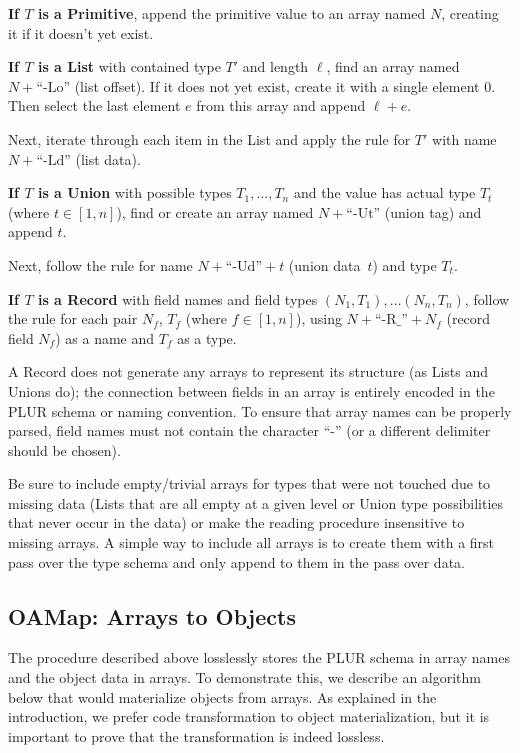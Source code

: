 \documentclass[10pt, conference, compsocconf]{IEEEtran}
\begin{document}
{\bf If $T$ is a Primitive}, append the primitive value to an array named $N$, creating it if it doesn't yet exist.

{\bf If $T$ is a List} with contained type $T'$ and length $\ell$, find an array named $N + \mbox{``-Lo''}$ (list offset). If it does not yet exist, create it with a single element $0$. Then select the last element $e$ from this array and append $\ell + e$.

Next, iterate through each item in the List and apply the rule for $T'$ with name $N + \mbox{``-Ld''}$ (list data).

{\bf If $T$ is a Union} with possible types $T_1, \ldots, T_n$ and the value has actual type $T_t$ (where $t \in [1, n]$), find or create an array named $N + \mbox{``-Ut''}$ (union tag) and append $t$.

Next, follow the rule for name $N + \mbox{``-Ud''} + t$ (union data~$t$) and type $T_t$.

{\bf If $T$ is a Record} with field names and field types $(N_1, T_1), \ldots (N_n, T_n)$, follow the rule for each pair $N_f$, $T_f$ (where $f \in [1, n]$), using $N + \mbox{``-R\_''} + N_f$ (record field $N_f$) as a name and $T_f$ as a type.

A Record does not generate any arrays to represent its structure (as Lists and Unions do); the connection between fields in an array is entirely encoded in the PLUR schema or naming convention. To ensure that array names can be properly parsed, field names must not contain the character ``-'' (or a different delimiter should be chosen).

Be sure to include empty/trivial arrays for types that were not touched due to missing data (Lists that are all empty at a given level or Union type possibilities that never occur in the data) or make the reading procedure insensitive to missing arrays. A simple way to include all arrays is to create them with a first pass over the type schema and only append to them in the pass over data.

\subsection{OAMap: Arrays to Objects}

The procedure described above losslessly stores the PLUR schema in array names and the object data in arrays. To demonstrate this, we describe an algorithm below that would materialize objects from arrays. As explained in the introduction, we prefer code transformation to object materialization, but it is important to prove that the transformation is indeed lossless.
\end{document}
